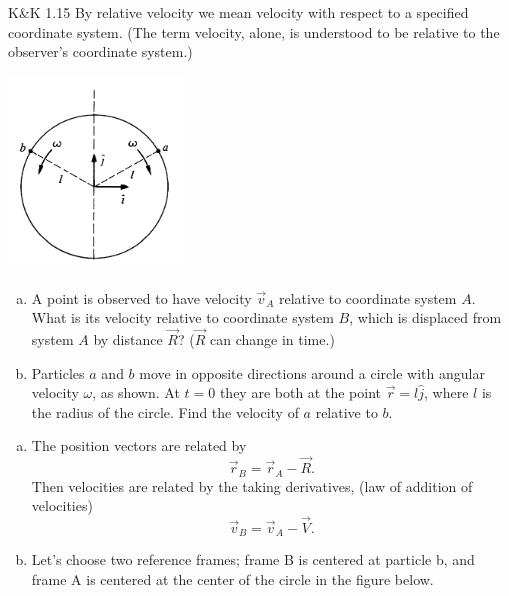 \documentclass{esg8012pset}
\begin{document}
\begin{question}[Problem 2]
\begin{problem}{K\&K 1.15}
  By relative velocity we mean velocity with respect to a specified coordinate system. (The term
  velocity, alone, is understood to be relative to the observer's coordinate system.)
  \begin{center}\includegraphics[width=0.35\textwidth]{ps01_2}\end{center}
  \begin{enumerate}[a.]
    \item A point is observed to have velocity $\vec v_A$ relative to coordinate system $A$. What is its
  velocity relative to coordinate system $B$, which is displaced from system $A$ by distance $\vec R$? ($\vec R$ can change in time.)
    \item Particles $a$ and $b$ move in opposite directions around a circle with angular velocity $\omega$,
  as shown. At $t = 0$ they are both at the point $\vec r = l\hat j$, where $l$ is the radius of the circle.
  Find the velocity of $a$ relative to $b$.
  \end{enumerate}
\end{problem}
\begin{solution}
  \begin{enumerate}[a.]
    \item The position vectors are related by $$\vec r_B = \vec r_A - \vec R.$$  Then velocities are related by the taking derivatives, (law of addition of velocities) $$\vec v_B = \vec v_A - \vec V.$$  %
    \item Let's choose two reference frames; frame B is centered at particle b, and frame A is centered at the center of the circle in the figure below.

\end{enumerate}
\end{solution}
\end{question}
\end{document}

